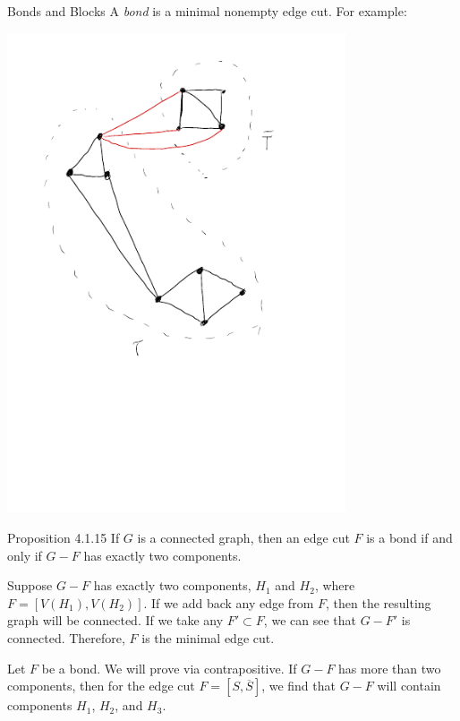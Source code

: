 \documentclass[10pt]{extarticle}
\begin{document}
  \begin{problem}{Bonds and Blocks}
    A \textit{bond} is a minimal nonempty edge cut. For example:
    \begin{center}
      \includegraphics[width=10cm]{minimal_edge_cut_example}
    \end{center}
    \begin{problem}{Proposition 4.1.15}
      If $G$ is a connected graph, then an edge cut $F$ is a bond if and only if $G-F$ has exactly two components.
      \tcblower
      \begin{description}[font=\normalfont\scshape]
        \item[$(\Leftarrow)$] Suppose $G-F$ has exactly two components, $H_1$ and $H_2$, where $F = [V(H_1),V(H_2)]$. If we add back any edge from $F$, then the resulting graph will be connected. If we take any $F'\subset F$, we can see that $G-F'$ is connected. Therefore, $F$ is the minimal edge cut.
        \item[$(\Rightarrow)$] Let $F$ be a bond. We will prove via contrapositive. If $G-F$ has more than two components, then for the edge cut $F = [S,\overline{S}]$, we find that $G-F$ will contain components $H_1$, $H_2$, and $H_3$. 
      \end{description}
    \end{problem}

\end{problem}
\end{document}
